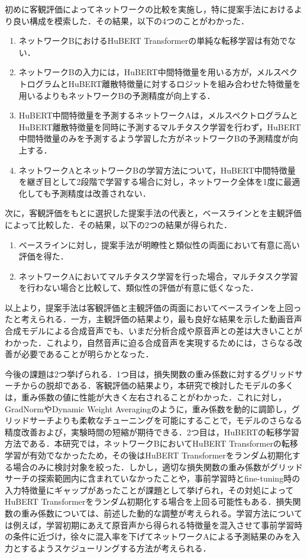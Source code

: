\documentclass[12pt]{jarticle}
\numberwithin{equation}{section}    %
\numberwithin{figure}{section}      %
\numberwithin{table}{section}      %
\begin{document}
初めに客観評価によってネットワークの比較を実施し，特に提案手法におけるより良い構成を模索した．その結果，以下の4つのことがわかった．
\begin{enumerate}
    \item ネットワークBにおけるHuBERT Transformerの単純な転移学習は有効でない．
    \item ネットワークBの入力には，HuBERT中間特徴量を用いる方が，メルスペクトログラムとHuBERT離散特徴量に対するロジットを組み合わせた特徴量を用いるよりもネットワークBの予測精度が向上する．
    \item HuBERT中間特徴量を予測するネットワークAは，メルスペクトログラムとHuBERT離散特徴量を同時に予測するマルチタスク学習を行わず，HuBERT中間特徴量のみを予測するよう学習した方がネットワークBの予測精度が向上する．
    \item ネットワークAとネットワークBの学習方法について，HuBERT中間特徴量を継ぎ目として2段階で学習する場合に対し，ネットワーク全体を1度に最適化しても予測精度は改善されない．
\end{enumerate}
次に，客観評価をもとに選択した提案手法の代表と，ベースラインとを主観評価によって比較した．その結果，以下の2つの結果が得られた．
\begin{enumerate}
    \item ベースラインに対し，提案手法が明瞭性と類似性の両面において有意に高い評価を得た．
    \item ネットワークAにおいてマルチタスク学習を行った場合，マルチタスク学習を行わない場合と比較して、類似性の評価が有意に低くなった．
\end{enumerate}

以上より，提案手法は客観評価と主観評価の両面においてベースラインを上回ったと考えられる．一方，主観評価の結果より，最も良好な結果を示した動画音声合成モデルによる合成音声でも、いまだ分析合成や原音声との差は大きいことがわかった．これより，自然音声に迫る合成音声を実現するためには，さらなる改善が必要であることが明らかとなった．

今後の課題は2つ挙げられる．1つ目は，損失関数の重み係数に対するグリッドサーチからの脱却である．客観評価の結果より，本研究で検討したモデルの多くは，重み係数の値に性能が大きく左右されることがわかった．これに対し，GradNormやDynamic Weight Averagingのように，重み係数を動的に調節し，グリッドサーチよりも柔軟なチューニングを可能にすることで，モデルのさらなる精度改善および，実験時間の短縮が期待できる．2つ目は，HuBERTの転移学習方法である．本研究では，ネットワークBにおいてHuBERT Transformerの転移学習が有効でなかったため，その後はHuBERT Transformerをランダム初期化する場合のみに検討対象を絞った．しかし，適切な損失関数の重み係数がグリッドサーチの探索範囲内に含まれていなかったことや，事前学習時とfine-tuning時の入力特徴量にギャップがあったことが課題として挙げられ，その対処によってHuBERT Transformerをランダム初期化する場合を上回る可能性もある．損失関数の重み係数については、前述した動的な調整が考えられる。学習方法については例えば，学習初期にあえて原音声から得られる特徴量を混入させて事前学習時の条件に近づけ，徐々に混入率を下げてネットワークAによる予測結果のみを入力とするようスケジューリングする方法が考えられる．
\end{document}
